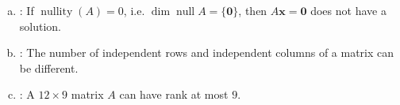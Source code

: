 \documentclass[12pt,letterpaper]{exam}
\DeclareMathOperator{\nullity}{nullity}
\begin{document}
\begin{questions}
\begin{enumerate}[(a)]
\item \underline{\itshape\hspace{0.65cm}\hspace{0.65cm}}: If $\nullity(A)= 0$, i.e. $\dim \operatorname{null} A= \{ \mathbf{0} \}$, then $A\mathbf{x}= \mathbf{0}$ does not have a solution. \vfill %

\item \underline{\itshape\hspace{0.65cm}\hspace{0.65cm}}: The number of independent rows and independent columns of a matrix can be different. \vfill %

\item \underline{\itshape\hspace{0.6cm}\hspace{0.6cm}}: A $12 \times 9$ matrix $A$ can have rank at most $9$. \par\vspace{1cm} %


\end{enumerate}

\end{questions}
\end{document}
